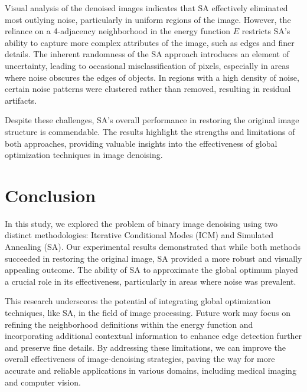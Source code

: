 \documentclass[conference]{IEEEtran}
\begin{document}
Visual analysis of the denoised images indicates that SA effectively eliminated most outlying noise, particularly in uniform regions of the image. However, the reliance on a 4-adjacency neighborhood in the energy function \(E\) restricts SA's ability to capture more complex attributes of the image, such as edges and finer details. The inherent randomness of the SA approach introduces an element of uncertainty, leading to occasional misclassification of pixels, especially in areas where noise obscures the edges of objects. In regions with a high density of noise, certain noise patterns were clustered rather than removed, resulting in residual artifacts.

Despite these challenges, SA's overall performance in restoring the original image structure is commendable. The results highlight the strengths and limitations of both approaches, providing valuable insights into the effectiveness of global optimization techniques in image denoising.

\section{Conclusion}

In this study, we explored the problem of binary image denoising using two distinct methodologies: Iterative Conditional Modes (ICM) and Simulated Annealing (SA). Our experimental results demonstrated that while both methods succeeded in restoring the original image, SA provided a more robust and visually appealing outcome. The ability of SA to approximate the global optimum played a crucial role in its effectiveness, particularly in areas where noise was prevalent.

This research underscores the potential of integrating global optimization techniques, like SA, in the field of image processing. Future work may focus on refining the neighborhood definitions within the energy function and incorporating additional contextual information to enhance edge detection further and preserve fine details. By addressing these limitations, we can improve the overall effectiveness of image-denoising strategies, paving the way for more accurate and reliable applications in various domains, including medical imaging and computer vision.
\end{document}
